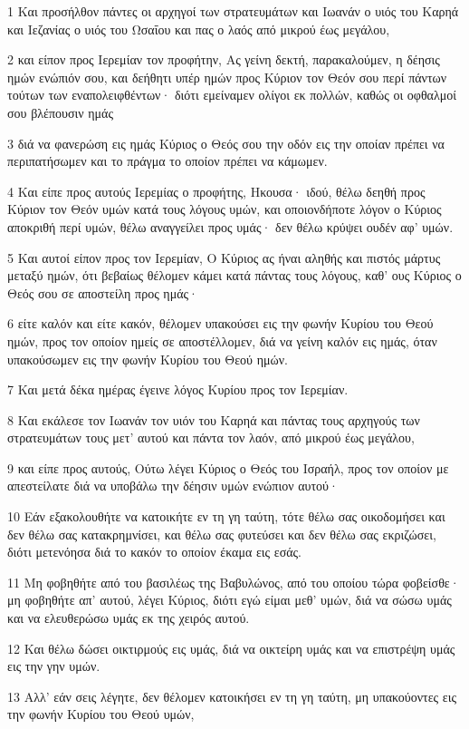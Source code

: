\par 1 Και προσήλθον πάντες οι αρχηγοί των στρατευμάτων και Ιωανάν ο υιός του Καρηά και Ιεζανίας ο υιός του Ωσαΐου και πας ο λαός από μικρού έως μεγάλου,
\par 2 και είπον προς Ιερεμίαν τον προφήτην, Ας γείνη δεκτή, παρακαλούμεν, η δέησις ημών ενώπιόν σου, και δεήθητι υπέρ ημών προς Κύριον τον Θεόν σου περί πάντων τούτων των εναπολειφθέντων· διότι εμείναμεν ολίγοι εκ πολλών, καθώς οι οφθαλμοί σου βλέπουσιν ημάς
\par 3 διά να φανερώση εις ημάς Κύριος ο Θεός σου την οδόν εις την οποίαν πρέπει να περιπατήσωμεν και το πράγμα το οποίον πρέπει να κάμωμεν.
\par 4 Και είπε προς αυτούς Ιερεμίας ο προφήτης, Ηκουσα· ιδού, θέλω δεηθή προς Κύριον τον Θεόν υμών κατά τους λόγους υμών, και οποιονδήποτε λόγον ο Κύριος αποκριθή περί υμών, θέλω αναγγείλει προς υμάς· δεν θέλω κρύψει ουδέν αφ' υμών.
\par 5 Και αυτοί είπον προς τον Ιερεμίαν, Ο Κύριος ας ήναι αληθής και πιστός μάρτυς μεταξύ ημών, ότι βεβαίως θέλομεν κάμει κατά πάντας τους λόγους, καθ' ους Κύριος ο Θεός σου σε αποστείλη προς ημάς·
\par 6 είτε καλόν και είτε κακόν, θέλομεν υπακούσει εις την φωνήν Κυρίου του Θεού ημών, προς τον οποίον ημείς σε αποστέλλομεν, διά να γείνη καλόν εις ημάς, όταν υπακούσωμεν εις την φωνήν Κυρίου του Θεού ημών.
\par 7 Και μετά δέκα ημέρας έγεινε λόγος Κυρίου προς τον Ιερεμίαν.
\par 8 Και εκάλεσε τον Ιωανάν τον υιόν του Καρηά και πάντας τους αρχηγούς των στρατευμάτων τους μετ' αυτού και πάντα τον λαόν, από μικρού έως μεγάλου,
\par 9 και είπε προς αυτούς, Ούτω λέγει Κύριος ο Θεός του Ισραήλ, προς τον οποίον με απεστείλατε διά να υποβάλω την δέησιν υμών ενώπιον αυτού·
\par 10 Εάν εξακολουθήτε να κατοικήτε εν τη γη ταύτη, τότε θέλω σας οικοδομήσει και δεν θέλω σας κατακρημνίσει, και θέλω σας φυτεύσει και δεν θέλω σας εκριζώσει, διότι μετενόησα διά το κακόν το οποίον έκαμα εις εσάς.
\par 11 Μη φοβηθήτε από του βασιλέως της Βαβυλώνος, από του οποίου τώρα φοβείσθε· μη φοβηθήτε απ' αυτού, λέγει Κύριος, διότι εγώ είμαι μεθ' υμών, διά να σώσω υμάς και να ελευθερώσω υμάς εκ της χειρός αυτού.
\par 12 Και θέλω δώσει οικτιρμούς εις υμάς, διά να οικτείρη υμάς και να επιστρέψη υμάς εις την γην υμών.
\par 13 Αλλ' εάν σεις λέγητε, δεν θέλομεν κατοικήσει εν τη γη ταύτη, μη υπακούοντες εις την φωνήν Κυρίου του Θεού υμών,
